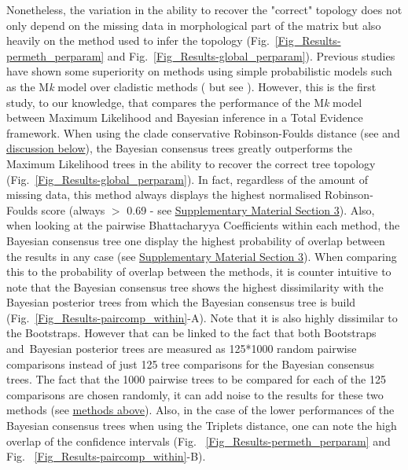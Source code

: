 \documentclass[12pt,letterpaper]{article}
\begin{document}
Nonetheless, the variation in the ability to recover the "correct" topology does not only depend on the missing data in morphological part of the matrix but also heavily on the method used to infer the topology (Fig.~\ref{Fig_Results-permeth_perparam} and Fig.~\ref{Fig_Results-global_perparam}). Previous studies have shown some superiority on methods using simple probabilistic models such as the M\textit{k} model \citep{lewisa2001} over cladistic methods (\citealt{wrightbayesian2014} but see \citealt{spencerefficacy2013}). However, this is the first study, to our knowledge, that compares the performance of the M\textit{k} model \citep{lewisa2001} between Maximum Likelihood and Bayesian inference in a Total Evidence framework. %
When using the clade conservative Robinson-Foulds distance (see \citealt{kuhnerpractical2014} and \hyperref[metrics_discussion]{discussion below}), the Bayesian consensus trees greatly outperforms the Maximum Likelihood trees in the ability to recover the correct tree topology (Fig.~\ref{Fig_Results-global_perparam}). In fact, regardless of the amount of missing data, this method always displays the highest normalised Robinson-Foulds score (always $>$ 0.69 - see \hyperref[SupplementaryMaterial]{Supplementary Material Section 3}). Also, when looking at the pairwise Bhattacharyya Coefficients within each method, the Bayesian consensus tree one display the highest probability of overlap between the results in any case (see \hyperref[SupplementaryMaterial]{Supplementary Material Section 3}).
When comparing this to the probability of overlap between the methods, it is counter intuitive to note that the Bayesian consensus tree shows the highest dissimilarity with the Bayesian posterior trees from which the Bayesian consensus tree is build (Fig.~\ref{Fig_Results-paircomp_within}-A). Note that it is also highly dissimilar to the Bootstraps. However that can be linked to the fact that both Bootstraps and Bayesian posterior trees are measured as 125*1000 random pairwise comparisons instead of just 125 tree comparisons for the Bayesian consensus trees. The fact that the 1000 pairwise trees to be compared for each of the 125 comparisons are chosen randomly, it can add noise to the results for these two methods (see \hyperref[tree_comparisons]{methods above}). Also, in the case of the lower performances of the Bayesian consensus trees when using the Triplets distance, one can note the high overlap of the confidence intervals (Fig. ~\ref{Fig_Results-permeth_perparam} and Fig. ~\ref{Fig_Results-paircomp_within}-B).
\end{document}
